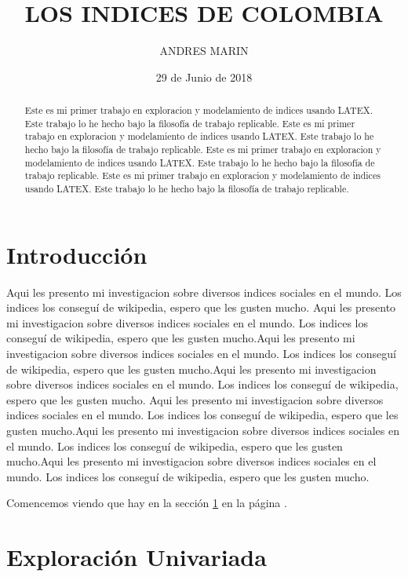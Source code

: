\documentclass{article}
\title{LOS INDICES DE COLOMBIA}
\author[1]{\normalsize ANDRES MARIN}
\affil[1]{\small  Escuela de Ingeniería,Universidad de los Andes\\
\texttt{{ja.marin11}@uniandes.edu.co}}
\date{29 de Junio de 2018}
\begin{document}


\maketitle


\begin{abstract}
Este es mi primer trabajo en exploracion y modelamiento de indices usando LATEX. Este trabajo lo he hecho bajo la filosofía de trabajo replicable. Este es mi primer trabajo en exploracion y modelamiento de indices usando LATEX. Este trabajo lo he hecho bajo la filosofía de trabajo replicable. Este es mi primer trabajo en exploracion y modelamiento de indices usando LATEX. Este trabajo lo he hecho bajo la filosofía de trabajo replicable. Este es mi primer trabajo en exploracion y modelamiento de indices usando LATEX. Este trabajo lo he hecho bajo la filosofía de trabajo replicable.
\end{abstract}

\section*{Introducción}

Aqui les presento mi investigacion sobre diversos indices sociales en el mundo. Los indices los conseguí de wikipedia, espero que les gusten mucho. Aqui les presento mi investigacion sobre diversos indices sociales en el mundo. Los indices los conseguí de wikipedia, espero que les gusten mucho.Aqui les presento mi investigacion sobre diversos indices sociales en el mundo. Los indices los conseguí de wikipedia, espero que les gusten mucho.Aqui les presento mi investigacion sobre diversos indices sociales en el mundo. Los indices los conseguí de wikipedia, espero que les gusten mucho.
Aqui les presento mi investigacion sobre diversos indices sociales en el mundo. Los indices los conseguí de wikipedia, espero que les gusten mucho.Aqui les presento mi investigacion sobre diversos indices sociales en el mundo. Los indices los conseguí de wikipedia, espero que les gusten mucho.Aqui les presento mi investigacion sobre diversos indices sociales en el mundo. Los indices los conseguí de wikipedia, espero que les gusten mucho.

Comencemos viendo que hay en la sección \ref{univariada} en la página \pageref{univariada}.

\clearpage


\section{Exploración Univariada}\label{univariada}
\end{document}
